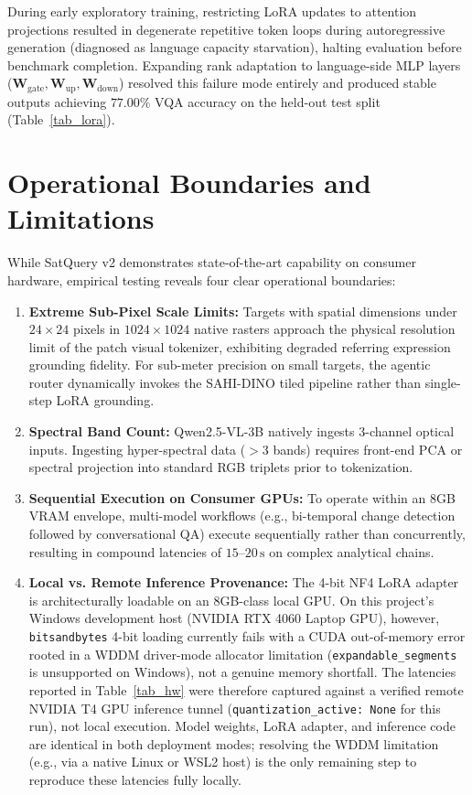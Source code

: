 \documentclass[lettersize,journal]{IEEEtran}
\begin{document}
During early exploratory training, restricting LoRA updates to attention projections resulted in degenerate repetitive token loops during autoregressive generation (diagnosed as language capacity starvation), halting evaluation before benchmark completion. Expanding rank adaptation to language-side MLP layers ($\mathbf{W}_{\text{gate}}, \mathbf{W}_{\text{up}}, \mathbf{W}_{\text{down}}$) resolved this failure mode entirely and produced stable outputs achieving $77.00\%$ VQA accuracy on the held-out test split (Table~\ref{tab_lora}).

\section{Operational Boundaries and Limitations}
\label{sec:limits}
While SatQuery v2 demonstrates state-of-the-art capability on consumer hardware, empirical testing reveals four clear operational boundaries:
\begin{enumerate}
    \item \textbf{Extreme Sub-Pixel Scale Limits:} Targets with spatial dimensions under $24 \times 24$ pixels in $1024 \times 1024$ native rasters approach the physical resolution limit of the patch visual tokenizer, exhibiting degraded referring expression grounding fidelity. For sub-meter precision on small targets, the agentic router dynamically invokes the SAHI-DINO tiled pipeline rather than single-step LoRA grounding.
    \item \textbf{Spectral Band Count:} Qwen2.5-VL-3B natively ingests 3-channel optical inputs. Ingesting hyper-spectral data ($>3$ bands) requires front-end PCA or spectral projection into standard RGB triplets prior to tokenization.
    \item \textbf{Sequential Execution on Consumer GPUs:} To operate within an 8GB VRAM envelope, multi-model workflows (e.g., bi-temporal change detection followed by conversational QA) execute sequentially rather than concurrently, resulting in compound latencies of $15\text{--}20\,\text{s}$ on complex analytical chains.
    \item \textbf{Local vs. Remote Inference Provenance:} The 4-bit NF4 LoRA adapter is architecturally loadable on an 8GB-class local GPU. On this project's Windows development host (NVIDIA RTX 4060 Laptop GPU), however, \texttt{bitsandbytes} 4-bit loading currently fails with a CUDA out-of-memory error rooted in a WDDM driver-mode allocator limitation (\texttt{expandable\_segments} is unsupported on Windows), not a genuine memory shortfall. The latencies reported in Table~\ref{tab_hw} were therefore captured against a verified remote NVIDIA T4 GPU inference tunnel (\texttt{quantization\_active: None} for this run), not local execution. Model weights, LoRA adapter, and inference code are identical in both deployment modes; resolving the WDDM limitation (e.g., via a native Linux or WSL2 host) is the only remaining step to reproduce these latencies fully locally.
\end{enumerate}
\end{document}
